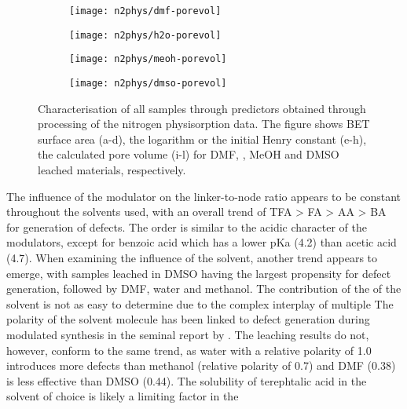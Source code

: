 \begin{figure}[htb]
    \begin{subfigure}{0.25\linewidth}
        \texttt{[image: n2phys/dmf-porevol]}%
        \caption{}%
        \label{def:fgr:n2phys-dmf-porevol}
    \end{subfigure}%
    \begin{subfigure}{0.25\linewidth}
        \texttt{[image: n2phys/h2o-porevol]}%
        \caption{}%
        \label{def:fgr:n2phys-h2o-porevol}
    \end{subfigure}%
    \begin{subfigure}{0.25\linewidth}
        \texttt{[image: n2phys/meoh-porevol]}%
        \caption{}%
        \label{def:fgr:n2phys-meoh-porevol}
    \end{subfigure}%
    \begin{subfigure}{0.25\linewidth}
        \texttt{[image: n2phys/dmso-porevol]}%
        \caption{}%
        \label{def:fgr:n2phys-dmso-porevol}
    \end{subfigure}%

    \caption{Characterisation of all samples through predictors
    obtained through processing of the nitrogen physisorption 
    data. The figure shows BET surface area (a-d), the logarithm
    or the initial Henry constant (e-h), the calculated pore volume 
    (i-l) for DMF, , MeOH and DMSO leached materials,
    respectively.}%
    \label{def:fgr:nitrogen-predictors}
    
\end{figure}

The influence of the modulator on the linker-to-node ratio appears to be
constant throughout the solvents used, with an overall trend of 
TFA > FA > AA > BA for generation of defects. The order is similar
to the acidic character of the modulators, except for 
benzoic acid which has a lower pKa (4.2) than acetic acid (4.7). 
When examining the influence of the solvent, another trend appears
to emerge, with samples leached in DMSO having the largest propensity
for defect generation, followed by DMF, water and methanol. 
The contribution of the of the solvent is not as easy to determine due
to the complex interplay of multiple 
The polarity of the solvent molecule has been linked to 
defect generation during modulated synthesis in the seminal
report by \citeauthor{shearerDefectEngineeringTuning2016}. The leaching
results do not, however, conform to the same trend, as water with a 
relative polarity of 1.0 introduces more defects than methanol 
(relative polarity of 0.7) and DMF (0.38) is less effective than 
DMSO (0.44). The solubility of terephtalic acid in the solvent 
of choice is likely a limiting factor in the 

